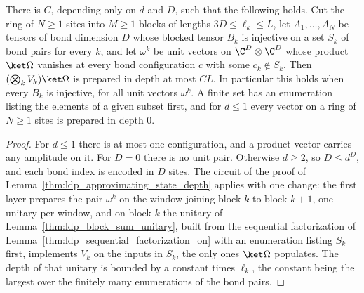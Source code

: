 \begin{theorem}
    \label{thm:ldp_chain_depth}
    \leanok
    There is $C$, depending only on $d$ and $D$, such that the following
    holds. Cut the ring of $N\ge1$ sites into $M\ge1$ blocks of lengths
    $3D\le\ell_k\le L$, let $A_1,\dots,A_N$ be tensors of bond dimension $D$
    whose blocked tensor $B_k$ is injective on a set $S_k$ of bond pairs for
    every $k$, and let $\omega^k$ be unit vectors on $\C^D\otimes\C^D$ whose
    product $\ket\Omega$ vanishes at every bond configuration $c$ with some
    $c_k\notin S_k$. Then $(\bigotimes_kV_k)\ket\Omega$ is prepared in depth at
    most $CL$. In particular this holds when every $B_k$ is injective, for all
    unit vectors $\omega^k$. A finite set has an enumeration listing the
    elements of a given subset first, and for $d\le1$ every vector on a ring of
    $N\ge1$ sites is prepared in depth $0$.
\end{theorem}
\begin{proof}
    \leanok
    For $d\le1$ there is at most one configuration, and a product vector
    carries any amplitude on it. For $D=0$ there is no unit pair. Otherwise
    $d\ge2$, so $D\le d^D$, and each bond index is encoded in $D$ sites. The
    circuit of the proof of Lemma~\ref{thm:ldp_approximating_state_depth}
    applies with one change: the first layer prepares the pair $\omega^k$ on
    the window joining block $k$ to block $k+1$, one unitary per window, and on
    block $k$ the unitary of Lemma~\ref{thm:ldp_block_sum_unitary},
    built from the sequential factorization of
    Lemma~\ref{thm:ldp_sequential_factorization_on} with an enumeration
    listing $S_k$ first, implements $V_k$ on the inputs in $S_k$, the only ones
    $\ket\Omega$ populates. The depth of that unitary is bounded by a constant
    times $\ell_k$, the constant being the largest over the finitely many
    enumerations of the bond pairs.
\end{proof}

